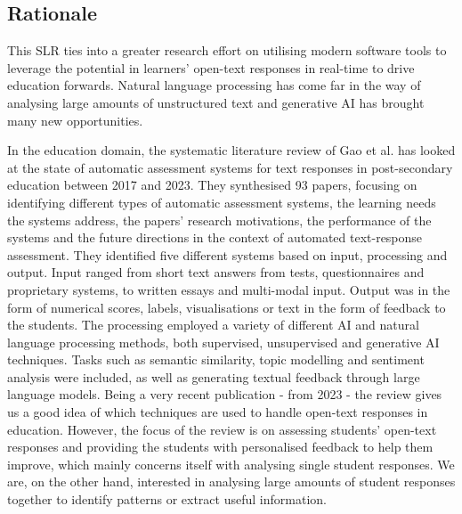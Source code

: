 \subsection{Rationale}
This SLR ties into a greater research effort on utilising modern software tools to leverage the potential in learners' open-text responses in real-time to drive education forwards. Natural language processing has come far in the way of analysing large amounts of unstructured text and generative AI has brought many new opportunities.

In the education domain, the systematic literature review of Gao et al. \cite{autoassessmentlitrev} has looked at the state of automatic assessment systems for text responses in post-secondary education between 2017 and 2023. They synthesised 93 papers, focusing on identifying different types of automatic assessment systems, the learning needs the systems address, the papers' research motivations, the performance of the systems and the future directions in the context of automated text-response assessment. They identified five different systems based on input, processing and output. Input ranged from short text answers from tests, questionnaires and proprietary systems, to written essays and multi-modal input. Output was in the form of numerical scores, labels, visualisations or text in the form of feedback to the students. The processing employed a variety of different AI and natural language processing methods, both supervised, unsupervised and generative AI techniques. Tasks such as semantic similarity, topic modelling and sentiment analysis were included, as well as generating textual feedback through large language models. Being a very recent publication - from 2023 - the review gives us a good idea of which techniques are used to handle open-text responses in education. However, the focus of the review is on assessing students' open-text responses and providing the students with personalised feedback to help them improve, which mainly concerns itself with analysing single student responses. We are, on the other hand, interested in analysing large amounts of student responses together to identify patterns or extract useful information.

